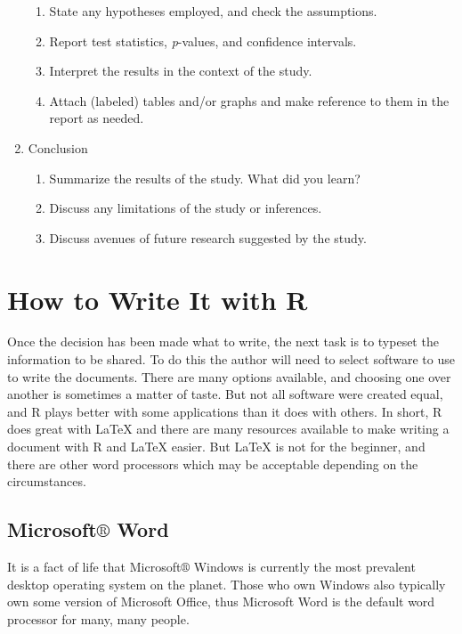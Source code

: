 \documentclass[captions=tableheading]{scrbook}
\begin{document}
\begin{enumerate}
\begin{enumerate}
\item State any hypotheses employed, and check the assumptions.
\item Report test statistics, \emph{p}-values, and confidence intervals.
\item Interpret the results in the context of the study.
\item Attach (labeled) tables and/or graphs and make reference to them in the report as needed.
\end{enumerate}
\item Conclusion
\begin{enumerate}
\item Summarize the results of the study. What did you learn?
\item Discuss any limitations of the study or inferences.
\item Discuss avenues of future research suggested by the study.
\end{enumerate}
\end{enumerate}
\section{How to Write It with R \label{sec:How-to-Write}}
\label{sec-22-2}

Once the decision has been made what to write, the next task is to typeset the information to be shared. To do this the author will need to select software to use to write the documents. There are many options available, and choosing one over another is sometimes a matter of taste. But not all software were created equal, and \textsf{R} plays better with some applications than it does with others. 
In short, \textsf{R} does great with \LaTeX{} and there are many resources available to make writing a document with \textsf{R} and \LaTeX{} easier. But \LaTeX{} is not for the beginner, and there are other word processors which may be acceptable depending on the circumstances.
\subsection{Microsoft\(\circledR\) Word}
\label{sec-22-2-1}

It is a fact of life that Microsoft\(\circledR\) Windows is currently the most prevalent desktop operating system on the planet. Those who own Windows also typically own some version of Microsoft Office, thus Microsoft Word is the default word processor for many, many people.  
\end{document}
